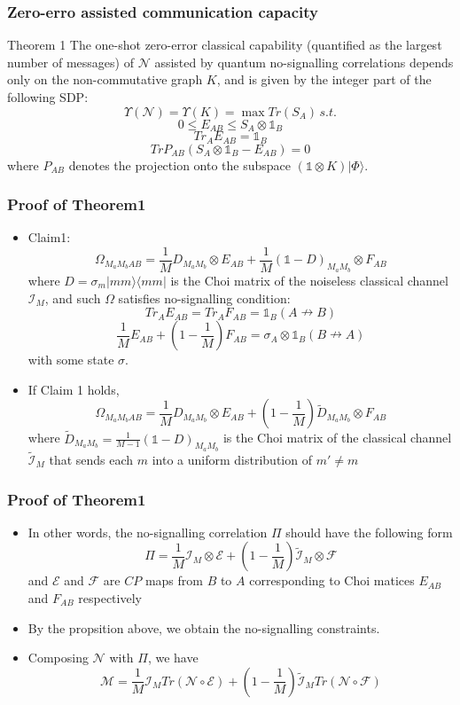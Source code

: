 \documentclass{beamer}
\begin{document}
\begin{frame}
\frametitle{Zero-erro assisted communication capacity}
\begin{block}{Theorem 1}
The one-shot zero-error classical capability (quantified as the largest number of messages) of $\mathcal{N}$ assisted by quantum no-signalling correlations depends only on the non-commutative graph $K$, and is given by the integer part of the following SDP:
\[
\Upsilon(\mathcal{N})=\Upsilon (K)=\max {Tr(S_A)}\, s.t.
\]
\[
0\leq E_{AB}\leq S_A\otimes\mathds{1}_B
\]
\[
Tr_A E_{AB}=\mathds{1}_B
\]
\[
TrP_{AB}(S_A\otimes\mathds{1}_B-E_{AB})=0
\]
where $P_{AB}$ denotes the projection onto the subspace $(\mathds{1}\otimes K)|\Phi\rangle$. 
\end{block}
\end{frame}

\begin{frame}
\frametitle{Proof of Theorem1}
\begin{itemize}
\item Claim1: 
\[
\Omega_{M_aM_bAB} = \frac{1}{M} D_{M_aM_b}\otimes E_{AB}+\frac{1}{M}(\mathds{1}-D)_{M_aM_b}\otimes F_{AB}
\]
where $D=\sigma_{m}|mm\rangle\langle mm|$ is the Choi matrix of the noiseless classical channel $\mathcal{I}_M$, and such $\Omega$ satisfies no-signalling condition:
\[
Tr_AE_{AB}=Tr_AF_{AB}=\mathds{1}_B (A\nrightarrow B)
\]
\[
\frac{1}{M} E_{AB}+(1-\frac{1}{M})F_{AB}=\sigma_A\otimes\mathds{1}_B (B\nrightarrow A)
\]
with some state $\sigma$.
\item If Claim 1 holds, 
\[
\Omega_{M_aM_bAB} = \frac{1}{M} D_{M_a M_b}\otimes E_{AB} + (1-\frac{1}{M})\tilde{D}_{M_aM_b}\otimes F_{AB}
\]
where $\tilde{D}_{M_aM_b}=\frac{1}{M-1}(\mathds{1}-D)_{M_a M_b}$ is the Choi matrix of the classical channel $\tilde{\mathcal{I}}_M$ that sends each $m$ into a uniform distribution of $m'\neq m$
\end{itemize}
\end{frame}

\begin{frame}
\frametitle{Proof of Theorem1}
\begin{itemize}
\item In other words, the no-signalling correlation $\Pi$ should have the following form
\[
\Pi = \frac{1}{M}\mathcal{I}_M\otimes \mathcal{E}+ (1-\frac{1}{M})\tilde{\mathcal{I}}_M\otimes \mathcal{F}
\]
and $\mathcal{E}$ and $\mathcal{F}$ are $CP$ maps from $B$ to $A$ corresponding to Choi matices $E_{AB}$ and $F_{AB}$ respectively

\item By the propsition above, we obtain the no-signalling constraints.
\item Composing $\mathcal{N}$ with $\Pi$, we have
\[
\mathcal{M}=\frac{1}{M}\mathcal{I}_M Tr(\mathcal{N}\circ \mathcal{E})+(1-\frac{1}{M})\tilde{\mathcal{I}}_M Tr(\mathcal{N}\circ \mathcal{F})
\]
\end{itemize}
\end{frame}
\end{document}
